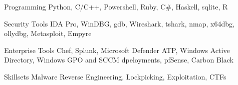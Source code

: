 


\begin{cvskills}


\cvskill
{Programming} %
{Python, C/C++, Powershell, Ruby, C\#, Haskell, sqlite, R} %


\cvskill
{Security Tools} %
{IDA Pro, WinDBG, gdb, Wireshark, tshark, nmap, x64dbg, ollydbg, Metasploit, Empyre} %


\cvskill
{Enterprise Tools} %
{Chef, Splunk, Microsoft Defender ATP, Windows Active Directory, Windows GPO and SCCM dpeloyments, pfSense, Carbon Black} %


\cvskill
{Skillsets} %
{Malware Reverse Engineering, Lockpicking, Exploitation, CTFs} %


\end{cvskills}